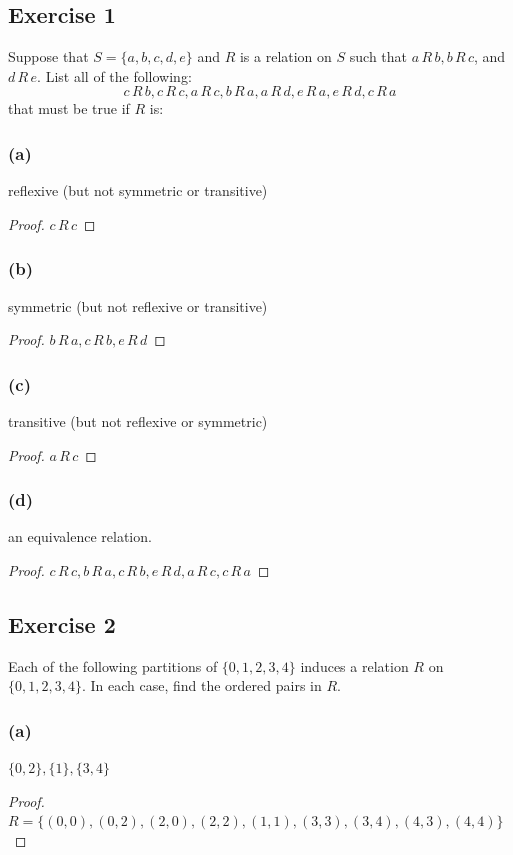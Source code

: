 \documentclass[14pt]{extarticle}
\begin{document}
\subsection{Exercise 1}
Suppose that \(S = \{a, b, c, d, e\}\) and $R$ is a relation on $S$ such that \(a \,R\, b, b \,R\, c\), and 
\(d \,R\, e\). List all of the following:
\[
c\,R\,b, c\,R\,c, a\,R\,c, b\,R\,a, a\,R\,d, e\,R\,a, e\,R\,d, c\,R\,a
\]
that must be true if $R$ is:

\subsubsection{(a)}
reflexive (but not symmetric or transitive)
\begin{proof}
\(c \,R\, c\)

\end{proof}

\subsubsection{(b)}
symmetric (but not reflexive or transitive)
\begin{proof}
\(b \,R\, a, c \,R\, b, e \,R\, d\)
\end{proof}

\subsubsection{(c)}
transitive (but not reflexive or symmetric)
\begin{proof}
\(a \,R\, c\)
\end{proof}

\subsubsection{(d)}
an equivalence relation.
\begin{proof}
\(c \,R\, c, b \,R\, a, c \,R\, b, e \,R\, d, a \,R\, c, c \,R\, a\)
\end{proof}

\subsection{Exercise 2}
Each of the following partitions of \(\{0, 1, 2, 3, 4\}\) induces a relation \(R\) on \(\{0, 1, 2, 3, 4\}\). In each 
case, find the ordered pairs in \(R\).

\subsubsection{(a)}
\(\{0, 2\}, \{1\}, \{3, 4\}\)
\begin{proof}
\(R = \{(0, 0), (0, 2), (2, 0), (2, 2), (1, 1), (3, 3), (3, 4), (4, 3), (4, 4)\}\)
\end{proof}
\end{document}
